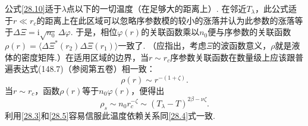 公式\eqref{28.10}适于$\lambda$点以下的一切温度（在足够大的距离上）. 在邻近$T_{\lambda}$，此公式适于$r\ll r_{c}$的距离上在此区域可以忽略序参数模的较小的涨落并认为此参数的涨落等于$\Delta\Xi=\mathrm{i}\sqrt{n_{0}}\,\Delta\varphi$. 于是，相位$\varphi(r)$的关联函数乘以$n_{0}$便与序参数的关联函数$\rho(r)=\langle\Delta\Xi^{*}(r_{2})\Delta\Xi(r_{1})\rangle$一致了. （应指出，考虑$\Xi$的波函数意义，$\rho$就是液体的密度矩阵.）在适用区域的边界，当$r\sim r_{c}$序参数关联函数在数量级上应该跟普遍表达式(148.7)（参阅第五卷）相一致：
\begin{equation}
\rho(r)\sim r^{-(1+\zeta)}.
\label{28.11}
\end{equation}
当$r\sim r_{c}$，函数$\rho(r)$等于$n_{0}\varphi(r)$，便得出
\begin{equation*}
\rho_{s}\sim n_{0}r_{c}^{-\zeta}\sim(T_{\lambda}-T)^{2\beta-\nu\zeta}.
\end{equation*}
利用\eqref{28.3}和\eqref{28.5}容易信服此温度依赖关系同\eqref{28.4}式一致.
